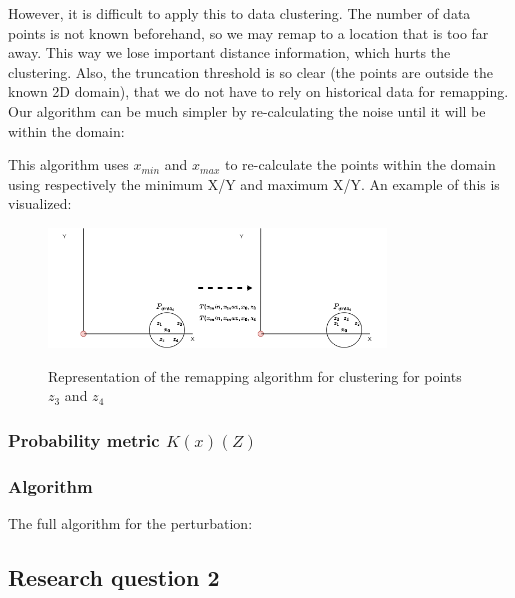 However, it is difficult to apply this to data clustering.
The number of data points is not known beforehand, so we may remap to a location that is too far away.
This way we lose important distance information, which hurts the clustering.
Also, the truncation threshold is so clear (the points are outside the known 2D domain), that we do not have to rely on historical data for remapping.
Our algorithm can be much simpler by re-calculating the noise until it will be within the domain:

This algorithm uses $x_{min}$ and $x_{max}$ to re-calculate the points within the domain using respectively the minimum X/Y and maximum X/Y.
An example of this is visualized:
\begin{figure}[h]
  \includegraphics[width=0.8\textwidth]{Method/images/truncation-rq1.png}
  \label{fig:truncation}
  \centering
  \caption{Representation of the remapping algorithm for clustering for points $z_3$ and $z_4$ }
\end{figure}

\subsubsection{Probability metric $K(x)(Z)$}

\newpage
\subsubsection{Algorithm}
The full algorithm for the perturbation:


\subsection{Research question 2}

